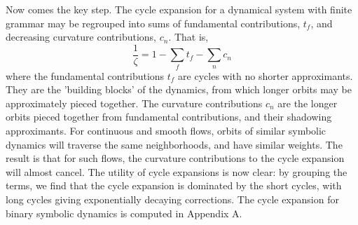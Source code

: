 \documentclass[pre,aps,twocolumn,showpacs,hyperref]{revtex4-1} %
\begin{document}
\indent Now comes the key step. The cycle expansion for a dynamical system with finite grammar may be regrouped into sums of fundamental contributions, $t_{f}$, and decreasing curvature contributions, $c_{n}$. That is,
\begin{equation}
\frac{1}{\zeta} = 1 - \sum_{f}t_{f} - \sum_{n}c_{n}
\end{equation}
where the fundamental contributions $t_{f}$ are cycles with no shorter approximants. They are the 'building blocks' of the dynamics, from which longer orbits may be approximately pieced together. The curvature contributions $c_{n}$ are the longer orbits pieced together from fundamental contributions, and their shadowing approximants. For continuous and smooth flows, orbits of similar symbolic dynamics will traverse the same neighborhoods, and have similar weights. The result is that for such flows, the curvature contributions to the cycle expansion will almost cancel. The utility of cycle expansions is now clear: by grouping the terms, we find that the cycle expansion is dominated by the short cycles, with long cycles giving exponentially decaying corrections. The cycle expansion for binary symbolic dynamics is computed in Appendix A.
\end{document}
